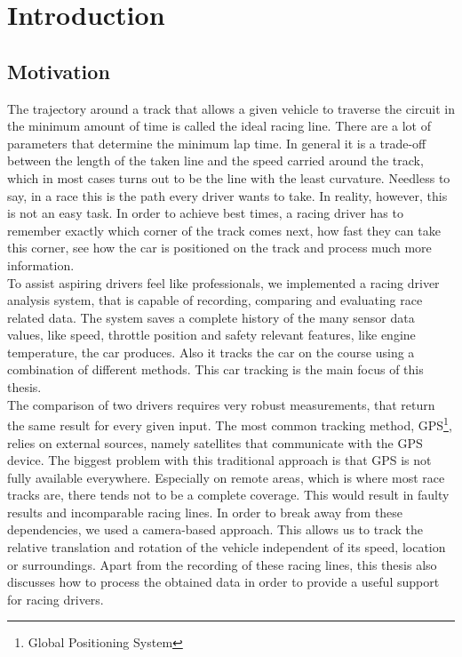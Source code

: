 \section{Introduction}
\label{sec:intro}

\subsection{Motivation}
The trajectory around a track that allows a given vehicle to traverse the circuit in the minimum amount of time is called the ideal racing line. There are a lot of parameters that determine the minimum lap time. In general it is a trade-off between the length of the taken line and the speed carried around the track, which in most cases turns out to be the line with the least curvature.  
Needless to say, in a race this is the path every driver wants to take. In reality, however, this is not an easy task. In order to achieve best times, a racing driver has to remember exactly which corner of the track comes next, how fast they can take this corner, see how the car is positioned on the track and process much more information.\\
To assist aspiring drivers feel like professionals, we implemented a racing driver analysis system, that is capable of recording, comparing and evaluating race related data. The system saves a complete history of the many sensor data values, like speed, throttle position and safety relevant features, like engine temperature, the car produces. Also it tracks the car on the course using a combination of different methods.
This car tracking is the main focus of this thesis. \\
The comparison of two drivers requires very robust measurements, that return the same result for every given input.
The most common tracking method, GPS\footnote{Global Positioning System}, relies on external sources, namely satellites that communicate with the GPS device. The biggest problem with this traditional approach is that GPS is not fully available everywhere. Especially on remote areas, which is where most race tracks are, there tends not to be a complete coverage. This would result in faulty results and incomparable racing lines.
\clearpage
In order to break away from these dependencies, we used a camera-based approach. This allows us to track the relative translation and rotation of the vehicle independent of its speed, location or surroundings.
Apart from the recording of these racing lines, this thesis also discusses how to process the obtained data in order to provide a useful support for racing drivers.

